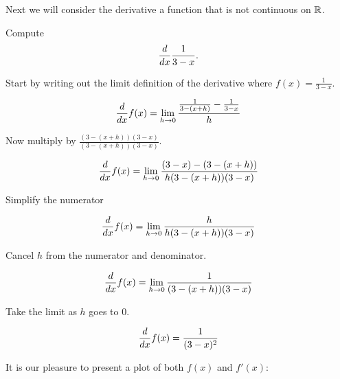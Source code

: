 \documentclass[handout]{ximera}
\begin{document}
Next we will consider the derivative a function that is not continuous
on $\mathbb R$.


\begin{example}
Compute
\[
\frac{d}{dx} \frac{1}{3-x}.
\]
\begin{explantion}
Start by writing out the limit definition of the derivative where
$f(x) = \frac{1}{3-x}$.
\begin{freeResponse}[given]
\[
\frac{d}{dx} f(x) = \lim_{h\to 0}\frac{\frac{1}{3-(x+h)} - \frac{1}{3-x}}{h}
\]
\end{freeResponse}
Now multiply by $\frac{(3-(x+h))(3-x)}{(3-(x+h))(3-x)}$.
\begin{freeResponse}[given]
\[
\frac{d}{dx} f(x) = \lim_{h\to 0}\frac{(3-x) - (3-(x+h))}{h(3-(x+h))(3-x)}
\]
\end{freeResponse}
Simplify the numerator
\begin{freeResponse}[given]
\[
\frac{d}{dx} f(x) = \lim_{h\to 0}\frac{h}{h(3-(x+h))(3-x)}
\]
\end{freeResponse}
Cancel $h$ from the numerator and denominator.
\begin{freeResponse}[given]
\[
\frac{d}{dx} f(x) = \lim_{h\to 0}\frac{1}{(3-(x+h))(3-x)}
\]
\end{freeResponse}
Take the limit as $h$ goes to $0$. 
\begin{freeResponse}[given]
\[
\frac{d}{dx} f(x) = \frac{1}{(3-x)^2}
\]
\end{freeResponse}
It is our pleasure to present a plot of both $f(x)$ and $f'(x)$:
\begin{image}
\end{image}
\end{explantion}
\end{example}
\end{document}
